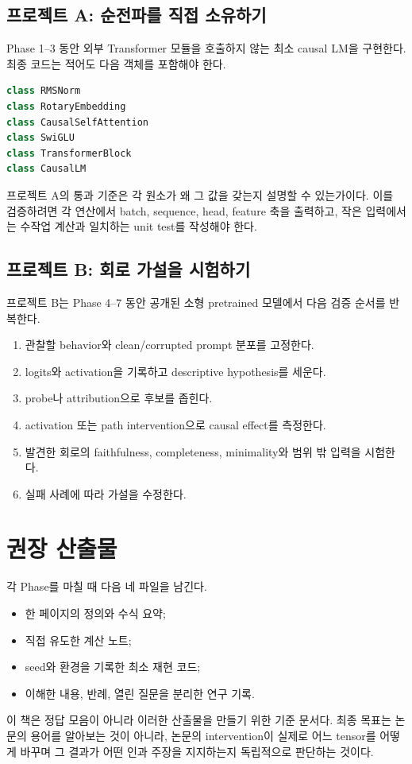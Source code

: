 \subsection*{프로젝트 A: 순전파를 직접 소유하기}

Phase 1--3 동안 외부 Transformer 모듈을 호출하지 않는 최소 causal LM을 구현한다.
최종 코드는 적어도 다음 객체를 포함해야 한다.

\begin{lstlisting}[language=Python]
class RMSNorm
class RotaryEmbedding
class CausalSelfAttention
class SwiGLU
class TransformerBlock
class CausalLM
\end{lstlisting}

프로젝트 A의 통과 기준은 각 원소가 왜 그 값을 갖는지 설명할 수 있는가이다.
이를 검증하려면 각 연산에서 batch, sequence, head, feature 축을 출력하고, 작은 입력에서는 수작업 계산과 일치하는 unit test를 작성해야 한다.

\subsection*{프로젝트 B: 회로 가설을 시험하기}

프로젝트 B는 Phase 4--7 동안 공개된 소형 pretrained 모델에서 다음 검증 순서를 반복한다.

\begin{enumerate}
  \item 관찰할 behavior와 clean/corrupted prompt 분포를 고정한다.
  \item logits와 activation을 기록하고 descriptive hypothesis를 세운다.
  \item probe나 attribution으로 후보를 좁힌다.
  \item activation 또는 path intervention으로 causal effect를 측정한다.
  \item 발견한 회로의 faithfulness, completeness, minimality와 범위 밖 입력을 시험한다.
  \item 실패 사례에 따라 가설을 수정한다.
\end{enumerate}

\section*{권장 산출물}

각 Phase를 마칠 때 다음 네 파일을 남긴다.

\begin{itemize}
  \item 한 페이지의 정의와 수식 요약;
  \item 직접 유도한 계산 노트;
  \item seed와 환경을 기록한 최소 재현 코드;
  \item 이해한 내용, 반례, 열린 질문을 분리한 연구 기록.
\end{itemize}

이 책은 정답 모음이 아니라 이러한 산출물을 만들기 위한 기준 문서다.
최종 목표는 논문의 용어를 알아보는 것이 아니라, 논문의 intervention이 실제로 어느 tensor를 어떻게 바꾸며 그 결과가 어떤 인과 주장을 지지하는지 독립적으로 판단하는 것이다.
